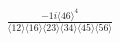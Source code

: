 \documentclass[varwidth, border=5pt]{standalone}
\begin{document}
\begin{my}
$\begin{gathered}
\scriptscriptstyle\frac{-1i⟨46⟩^4}{⟨12⟩⟨16⟩⟨23⟩⟨34⟩⟨45⟩⟨56⟩}
\end{gathered}$
\end{my}
\end{document}
